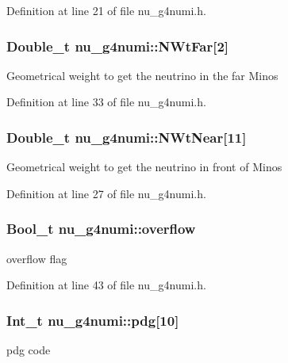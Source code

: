 Definition at line 21 of file nu\-\_\-g4numi.\-h.

\hypertarget{classnu__g4numi_ab097def1361df4a718707a7e757bb2ae}{
\subsubsection[{N\-Wt\-Far}]{\setlength{\rightskip}{0pt plus 5cm}Double\-\_\-t nu\-\_\-g4numi\-::\-N\-Wt\-Far\mbox{[}2\mbox{]}}}\label{classnu__g4numi_ab097def1361df4a718707a7e757bb2ae}
Geometrical weight to get the neutrino in the far Minos 

Definition at line 33 of file nu\-\_\-g4numi.\-h.

\hypertarget{classnu__g4numi_a87ebc26325bb08a63d21171db959101a}{
\subsubsection[{N\-Wt\-Near}]{\setlength{\rightskip}{0pt plus 5cm}Double\-\_\-t nu\-\_\-g4numi\-::\-N\-Wt\-Near\mbox{[}11\mbox{]}}}\label{classnu__g4numi_a87ebc26325bb08a63d21171db959101a}
Geometrical weight to get the neutrino in front of Minos 

Definition at line 27 of file nu\-\_\-g4numi.\-h.

\hypertarget{classnu__g4numi_ad584f37592af684c65205de115a9aa85}{
\subsubsection[{overflow}]{\setlength{\rightskip}{0pt plus 5cm}Bool\-\_\-t nu\-\_\-g4numi\-::overflow}}\label{classnu__g4numi_ad584f37592af684c65205de115a9aa85}
overflow flag 

Definition at line 43 of file nu\-\_\-g4numi.\-h.

\hypertarget{classnu__g4numi_a4ed6688aee6debd26637a0401e5ef475}{
\subsubsection[{pdg}]{\setlength{\rightskip}{0pt plus 5cm}Int\-\_\-t nu\-\_\-g4numi\-::pdg\mbox{[}10\mbox{]}}}\label{classnu__g4numi_a4ed6688aee6debd26637a0401e5ef475}
pdg code 

